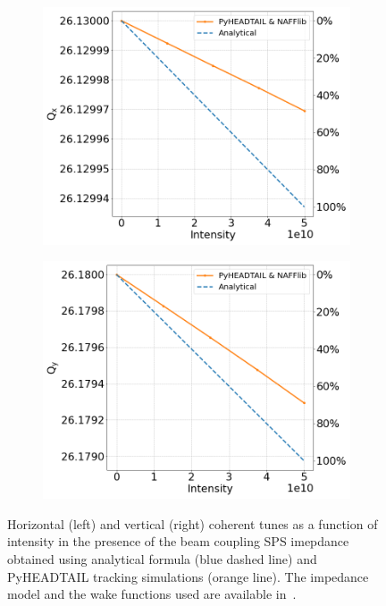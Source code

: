\begin{figure}[!ht]
    \centering
    \begin{subfigure}[t]{0.45\textwidth}
        \centering
        \includegraphics[width=1\textwidth]{images/Ch7/Qx_vs_intensity_complete_impedance_sps_q26model_MD2018_parameters.png}
    \end{subfigure}
    \hfill
    \begin{subfigure}[t]{0.45\textwidth}
        \centering
        \includegraphics[width=1\textwidth]{images/Ch7/Qy_vs_intensity_complete_impedance_sps_q26model_MD2018_parameters.png}
    \end{subfigure}
    \hfill
     \caption{Horizontal (left) and vertical (right) coherent tunes as a function of intensity in the presence of the beam coupling SPS imepdance obtained using analytical formula (blue dashed line) and PyHEADTAIL tracking simulations (orange line). The impedance model and the wake functions used are available in~\cite{sps_impedance_model_git}.} %
     \label{fig:sps_coherent_DQ_vs_intensity_original_complete_model}
 \end{figure}

